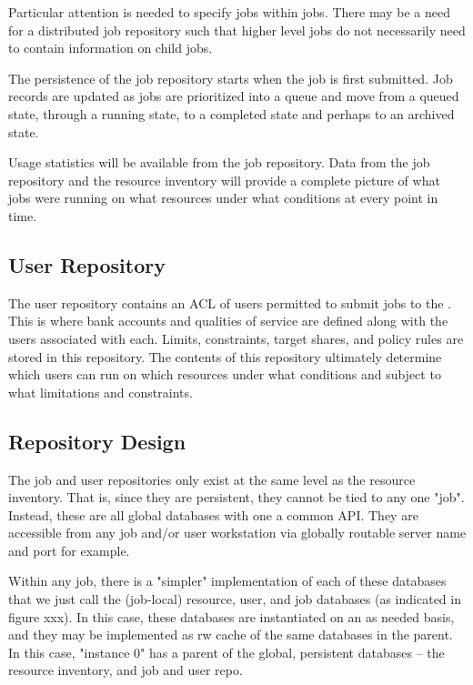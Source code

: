 Particular attention is needed to specify jobs within jobs.  There may
be a need for a distributed job repository such that higher level jobs
do not necessarily need to contain information on child jobs.

The persistence of the job repository starts when the job is first
submitted.  Job records are updated as jobs are prioritized into a
queue and move from a queued state, through a running state, to a
completed state and perhaps to an archived state.

Usage statistics will be available from the job repository.  Data from
the job repository and the resource inventory will provide a complete
picture of what jobs were running on what resources under what
conditions at every point in time.

\subsection{User Repository}

The user repository contains an ACL of users permitted to submit jobs
to the \ngrm.  This is where bank accounts and qualities of service
are defined along with the users associated with each.  Limits,
constraints, target shares, and policy rules are stored in this
repository.  The contents of this repository ultimately determine
which users can run on which resources under what conditions and
subject to what limitations and constraints.

\subsection{Repository Design}

The job and user repositories only exist at the same level as the
resource inventory. That is, since they are persistent, they cannot be
tied to any one "job". Instead, these are all global databases with
one a common API.  They are accessible from any job and/or user
workstation via globally routable server name and port for example.

Within any job, there is a "simpler" implementation of each of these
databases that we just call the (job-local) resource, user, and job
databases (as indicated in figure xxx).  In this case, these databases
are instantiated on an as needed basis, and they may be implemented as
rw cache of the same databases in the parent. In this case, "instance
0" has a parent of the global, persistent databases -- the resource
inventory, and job and user repo.

